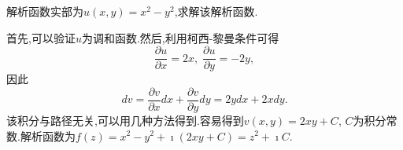 \begin{example}
解析函数实部为$u(x,y) = x^2 - y^2$,求解该解析函数.
\end{example}
\begin{solution}
首先,可以验证$u$为调和函数.然后,利用柯西-黎曼条件可得
\begin{equation}
    \frac{\partial u}{\partial x } = 2x, \; \frac{\partial u}{\partial y } = -2y  ,
\end{equation}
因此
\begin{equation}
    d v = \frac{\partial v}{\partial x } dx + \frac{\partial v}{\partial y } dy = 2y dx + 2x dy .
\end{equation}
该积分与路径无关,可以用几种方法得到.容易得到$v(x,y) = 2xy + C$, $C$为积分常数.解析函数为$f(z)=x^2 - y^2 + \imath (2x y + C) = z^2 + \imath C$.
\end{solution}
    